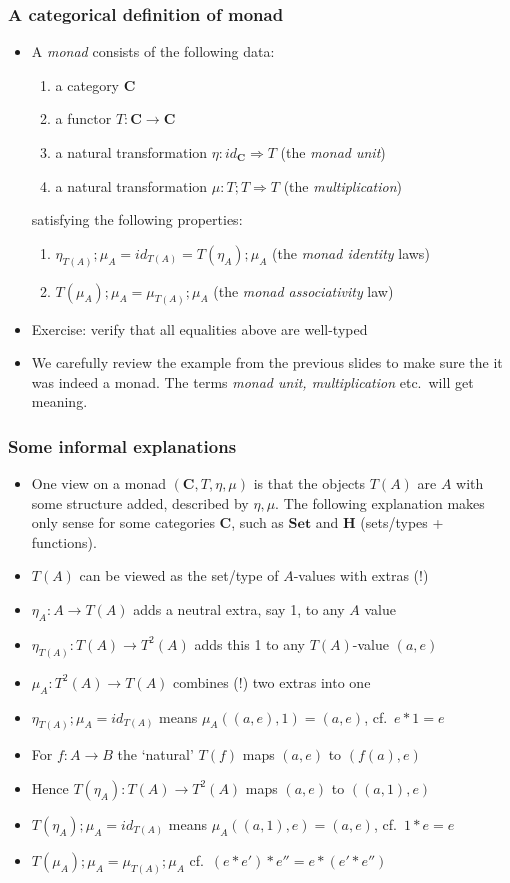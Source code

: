 \documentclass[handout]{beamer}
\newcommand{\To}{\Rightarrow}
\newcommand{\bfsf}[1]{{\boldsymbol{#1}}}
\newcommand{\Set}{\bfsf{Set}}
\newcommand{\CC}{\bfsf{C}}
\newcommand{\HH}{\bfsf{H}}
\begin{document}
\frame
  {   
    \frametitle{A categorical definition of monad}\label{Mon5:CatDefMonad}

 \begin{itemize}[<+->]
\item A \emph{monad} consists of the following data:
 \begin{enumerate}
    \item a category $\CC$
    \item a functor $T:\CC\to\CC$
    \item a natural transformation $\eta: id_\CC \To T$ (the \emph{monad unit})
    \item a natural transformation $\mu: T;T \To T$ (the \emph{multiplication})
 \end{enumerate}
satisfying the following properties:
 \begin{enumerate}
    \item $\eta_{T(A)};\mu_A = id_{T(A)} = T(\eta_A);\mu_A$ (the \emph{monad identity} laws)
    \item $T(\mu_A);\mu_A = \mu_{T(A)};\mu_A$ (the \emph{monad associativity} law)
 \end{enumerate}
\item Exercise: verify that all equalities above are well-typed
\item We carefully review the example from the previous slides to 
make sure the it was indeed a monad. 
The terms \emph{monad unit, multiplication} etc.\ will get meaning. 
 \end{itemize}

 }

\frame
  {   
    \frametitle{Some informal explanations}\label{Mon5:InfoMonad}

 \begin{itemize}[<+->]
\item One view on a monad $(\CC,T,\eta,\mu)$ is that the objects $T(A)$ are $A$
with some structure added, described by $\eta,\mu$. The following explanation
makes only sense for some categories $\CC$, such as $\Set$ and $\HH$ 
(sets/types + functions).
\item $T(A)$ can be viewed as the set/type of $A$-values with {\color{red}extras (!)}
\item $\eta_A : A\to T(A)$ adds a neutral extra, say 1, to any $A$ value
\item $\eta_{T(A)} : T(A)\to T^2(A)$ adds this 1 to any $T(A)$-value $(a,e)$
\item $\mu_A: T^2(A)\to T(A)$ {\color{red}combines (!)} two extras into one
\item $\eta_{T(A)};\mu_A = id_{T(A)}$ means $\mu_A((a,e),1) = (a,e)$, cf.\ $e*1=e$
\item For $f:A\to B$ the `natural' $T(f)$ maps $(a,e)$ to $(f(a),e)$
\item Hence $T(\eta_A) : T(A)\to T^2(A)$ maps $(a,e)$ to $((a,1),e)$
\item $T(\eta_A);\mu_A=id_{T(A)}$ means $\mu_A((a,1),e) = (a,e)$, cf.\ $1*e=e$
\item $T(\mu_A);\mu_A = \mu_{T(A)};\mu_A$ cf.\ $(e*e')*e'' = e*(e'*e'')$
 \end{itemize}

 }
\end{document}
